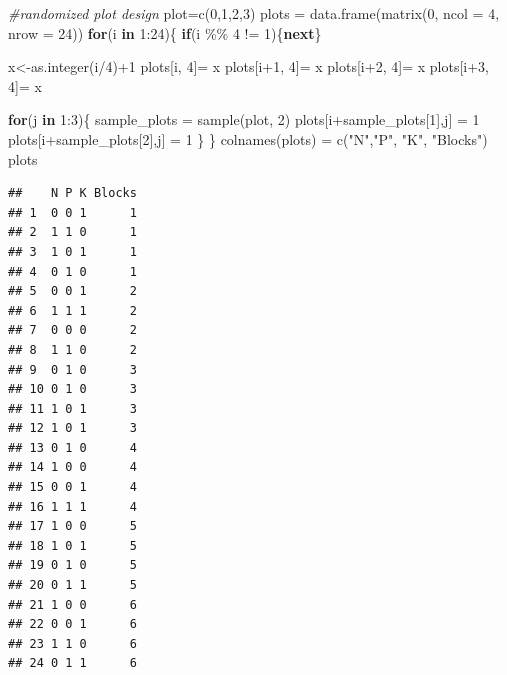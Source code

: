 \documentclass[
]{article}
\newenvironment{Shaded}{\begin{snugshade}}{\end{snugshade}}
\newcommand{\AttributeTok}[1]{\textcolor[rgb]{0.77,0.63,0.00}{#1}}
\newcommand{\CommentTok}[1]{\textcolor[rgb]{0.56,0.35,0.01}{\textit{#1}}}
\newcommand{\ControlFlowTok}[1]{\textcolor[rgb]{0.13,0.29,0.53}{\textbf{#1}}}
\newcommand{\DecValTok}[1]{\textcolor[rgb]{0.00,0.00,0.81}{#1}}
\newcommand{\FunctionTok}[1]{\textcolor[rgb]{0.00,0.00,0.00}{#1}}
\newcommand{\NormalTok}[1]{#1}
\newcommand{\OtherTok}[1]{\textcolor[rgb]{0.56,0.35,0.01}{#1}}
\newcommand{\SpecialCharTok}[1]{\textcolor[rgb]{0.00,0.00,0.00}{#1}}
\newcommand{\StringTok}[1]{\textcolor[rgb]{0.31,0.60,0.02}{#1}}
\begin{document}
\begin{Shaded}
\begin{Highlighting}[]
\CommentTok{\#randomized plot design}
\NormalTok{plot}\OtherTok{=}\FunctionTok{c}\NormalTok{(}\DecValTok{0}\NormalTok{,}\DecValTok{1}\NormalTok{,}\DecValTok{2}\NormalTok{,}\DecValTok{3}\NormalTok{)}
\NormalTok{plots }\OtherTok{=} \FunctionTok{data.frame}\NormalTok{(}\FunctionTok{matrix}\NormalTok{(}\DecValTok{0}\NormalTok{, }\AttributeTok{ncol =} \DecValTok{4}\NormalTok{, }\AttributeTok{nrow =} \DecValTok{24}\NormalTok{))}
\ControlFlowTok{for}\NormalTok{(i }\ControlFlowTok{in} \DecValTok{1}\SpecialCharTok{:}\DecValTok{24}\NormalTok{)\{}
  \ControlFlowTok{if}\NormalTok{(i }\SpecialCharTok{\%\%} \DecValTok{4} \SpecialCharTok{!=} \DecValTok{1}\NormalTok{)\{}\ControlFlowTok{next}\NormalTok{\}}
  
\NormalTok{  x}\OtherTok{\textless{}{-}}\FunctionTok{as.integer}\NormalTok{(i}\SpecialCharTok{/}\DecValTok{4}\NormalTok{)}\SpecialCharTok{+}\DecValTok{1}
\NormalTok{  plots[i, }\DecValTok{4}\NormalTok{]}\OtherTok{=}\NormalTok{ x}
\NormalTok{  plots[i}\SpecialCharTok{+}\DecValTok{1}\NormalTok{, }\DecValTok{4}\NormalTok{]}\OtherTok{=}\NormalTok{ x}
\NormalTok{  plots[i}\SpecialCharTok{+}\DecValTok{2}\NormalTok{, }\DecValTok{4}\NormalTok{]}\OtherTok{=}\NormalTok{ x}
\NormalTok{  plots[i}\SpecialCharTok{+}\DecValTok{3}\NormalTok{, }\DecValTok{4}\NormalTok{]}\OtherTok{=}\NormalTok{ x}
  
  \ControlFlowTok{for}\NormalTok{(j }\ControlFlowTok{in} \DecValTok{1}\SpecialCharTok{:}\DecValTok{3}\NormalTok{)\{}
\NormalTok{    sample\_plots }\OtherTok{=} \FunctionTok{sample}\NormalTok{(plot, }\DecValTok{2}\NormalTok{)}
\NormalTok{    plots[i}\SpecialCharTok{+}\NormalTok{sample\_plots[}\DecValTok{1}\NormalTok{],j] }\OtherTok{=} \DecValTok{1}
\NormalTok{    plots[i}\SpecialCharTok{+}\NormalTok{sample\_plots[}\DecValTok{2}\NormalTok{],j] }\OtherTok{=} \DecValTok{1}
\NormalTok{  \}}
\NormalTok{\}}
\FunctionTok{colnames}\NormalTok{(plots) }\OtherTok{=} \FunctionTok{c}\NormalTok{(}\StringTok{"N"}\NormalTok{,}\StringTok{"P"}\NormalTok{, }\StringTok{"K"}\NormalTok{, }\StringTok{"Blocks"}\NormalTok{)}
\NormalTok{plots}
\end{Highlighting}
\end{Shaded}

\begin{verbatim}
##    N P K Blocks
## 1  0 0 1      1
## 2  1 1 0      1
## 3  1 0 1      1
## 4  0 1 0      1
## 5  0 0 1      2
## 6  1 1 1      2
## 7  0 0 0      2
## 8  1 1 0      2
## 9  0 1 0      3
## 10 0 1 0      3
## 11 1 0 1      3
## 12 1 0 1      3
## 13 0 1 0      4
## 14 1 0 0      4
## 15 0 0 1      4
## 16 1 1 1      4
## 17 1 0 0      5
## 18 1 0 1      5
## 19 0 1 0      5
## 20 0 1 1      5
## 21 1 0 0      6
## 22 0 0 1      6
## 23 1 1 0      6
## 24 0 1 1      6
\end{verbatim}
\end{document}
